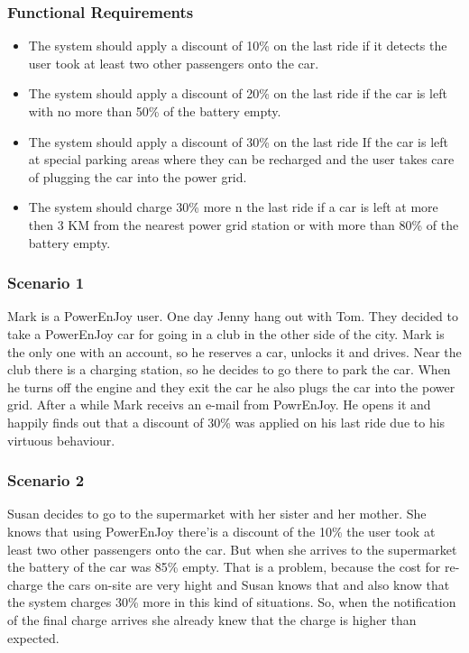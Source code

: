 \subsubsection{Functional Requirements}
\begin{itemize}
  \item The system should apply a discount of 10\% on the last ride if it detects the user took at least two other passengers onto the car.
  \item The system should apply a discount of 20\% on the last ride if the car is left with no more than 50\% of the battery empty.
  \item The system should apply a discount of 30\% on the last ride If the car is left at special parking areas where they can be recharged and the user takes care of plugging the car into the power grid.
  \item The system should charge 30\% more n the last ride if a car is left at more then 3 KM from the nearest power grid station or with more than 80\% of the battery empty.
\end{itemize}

\subsubsection{Scenario 1}
Mark is a PowerEnJoy user. One day Jenny hang out with Tom. They decided to take a PowerEnJoy car for going in a club in the other side of the city. Mark is the only one with an account, so he reserves a car, unlocks it and drives. Near the club there is a \gls{charging station}, so he decides to go there to park the car. When he turns off the engine and they exit the car he also plugs the car into the power grid. After a while Mark receivs an e-mail from PowrEnJoy. He opens it and happily finds out that a discount of 30\% was applied on his last ride due to his virtuous behaviour.

\subsubsection{Scenario 2}
Susan decides to go to the supermarket with her sister and her mother. She knows that using PowerEnJoy there'is a discount of the 10\% the user took at least two other passengers onto the car. But when she arrives to the supermarket the battery of the car was 85\% empty. That is a problem, because the cost for re-charge the cars on-site are very hight and Susan knows that and also know that the system charges 30\% more in this kind of situations. So, when the notification of the final charge arrives she already knew that the charge is higher than expected.



